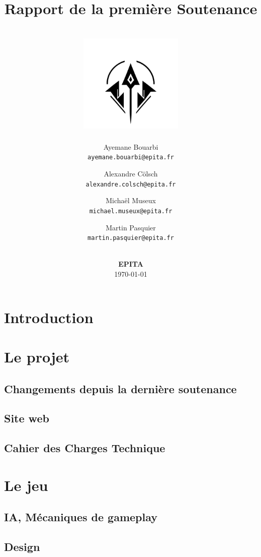 \documentclass[12pt]{article}
\title{
    Rapport de la première Soutenance \\
    \textbf{\gameName} \\
    \vspace{0.5cm}
    \includegraphics[width=5cm]{0.format/logo.png}
    \vspace{4.2cm}
}
\author{
    Ayemane Bouarbi \\
    \texttt{ayemane.bouarbi@epita.fr}
    \vspace{0.5cm}\and
    Alexandre Cölsch \\
    \texttt{alexandre.colsch@epita.fr}
    \vspace{0.5cm}\and
    Michaël Museux \\
    \texttt{michael.museux@epita.fr}
    \vspace{0.5cm}\and
    Martin Pasquier \\
    \texttt{martin.pasquier@epita.fr}
}
\date{
    \vspace{1.5cm}
    \textbf{\companyName} \\
    \vspace{0.3cm}
    \textbf{EPITA} \\
    \vspace{1.5cm}
    \today
}
\begin{document}
\begin{titlepage}
    \maketitle
    \thispagestyle{empty} %
\end{titlepage}

\newpage
\thispagestyle{empty}
\mbox{}

\newpage
\tableofcontents

\newpage
\section{Introduction}



\newpage
\section{Le projet}

\subsection{Changements depuis la dernière soutenance}


\subsection{Site web}


\subsection{Cahier des Charges Technique}



\newpage
\section{Le jeu}

\subsection{IA, Mécaniques de gameplay}


\subsection{Design}

\end{document}
